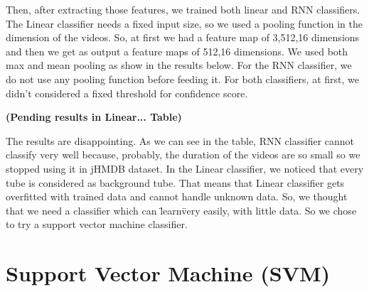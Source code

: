 \documentclass{report}
\begin{document}
Then, after extracting those features, we trained both linear and RNN classifiers. The Linear classifier needs a fixed input size,
so we used a pooling function in the dimension of the videos. So, at first we had a feature map of 3,512,16 dimensions and then we
get as output a feature maps of 512,16 dimensions. We used both max and mean pooling as show in the results below. For the RNN
classifier, we do not use any pooling function before feeding it. For both classifiers, at first, we didn't considered a fixed
threshold for confidence score.

\textbf{(Pending results in Linear... Table)}

The results are disappointing.
As we can see in the table, RNN classifier cannot classify very well because, probably, the duration of the videos are so small
so we stopped using it in jHMDB dataset. In the Linear classifier, we noticed that every tube is considered as background tube.
That means that Linear classifier gets overfitted with trained data and cannot handle unknown data. So, we thought that we
need a classifier which can \"learn\" very easily, with little data. So we chose to try a support vector machine classifier.

\section{Support Vector Machine (SVM)}
\end{document}
